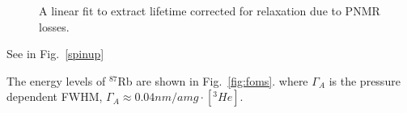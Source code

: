 \documentclass[pdftex,letterpaper,12pt]{report}
\begin{document}
\begin{figure}[t!]
	\centering
	\caption{{A linear fit to extract lifetime corrected for relaxation due to PNMR losses.}}
	\label{corrected_T1}
\end{figure}

See in Fig.~\ref{spinup}


	
The energy levels of $^{87}$Rb are shown in Fig.~\ref{fig:foms}.
where $\Gamma_{A}$ is the pressure dependent FWHM, $\Gamma_{A}\approx 0.04nm/amg \cdot [^{3}He]$.


\end{document}
